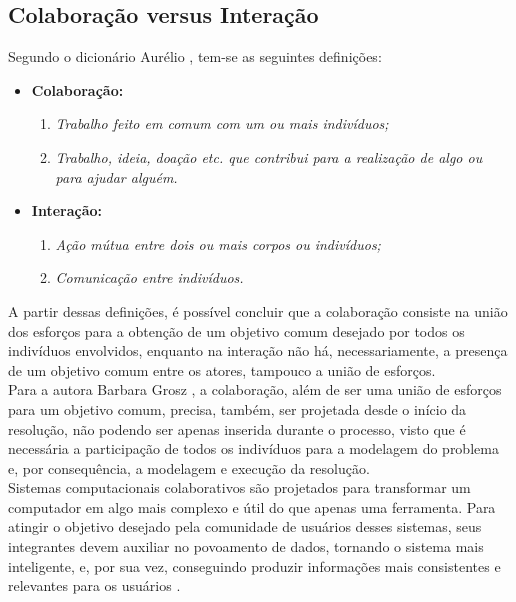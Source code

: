 \subsection{Colaboração versus Interação}
\null \quad Segundo o dicionário Aurélio \cite{aurelio}, tem-se as seguintes definições:%
\begin{itemize}
  \item \textbf{Colaboração:}
  \begin{enumerate}
    \item \textit{Trabalho feito em comum com um ou mais indivíduos;}
    \item \textit{Trabalho, ideia, doação etc. que contribui para a realização de algo ou para ajudar alguém.}
  \end{enumerate}

  \item \textbf{Interação:}
  \begin{enumerate}
    \item \textit{Ação mútua entre dois ou mais corpos ou indivíduos;}
    \item \textit{Comunicação entre indivíduos.}
  \end{enumerate}
\end{itemize}
 \null
\quad A partir dessas definições, é possível concluir que a colaboração consiste na união dos esforços
para a obtenção de um objetivo comum desejado por todos os indivíduos envolvidos, enquanto na interação
não há, necessariamente, a presença de um objetivo comum entre os atores, tampouco a união de esforços. \\ \null \quad
Para a autora Barbara Grosz \cite{cbarbara}, a colaboração, além de ser uma união de esforços para um objetivo comum,
precisa, também, ser projetada desde o início da resolução, não podendo ser apenas inserida durante o processo, visto que é
necessária a participação de todos os indivíduos para a modelagem do problema e, por consequência, a modelagem e execução da resolução.
\\
\null \quad Sistemas computacionais colaborativos são projetados para transformar um computador em algo mais complexo e útil do que apenas uma ferramenta.
Para atingir o objetivo desejado pela comunidade de usuários desses sistemas, seus integrantes devem auxiliar no povoamento de dados,
tornando o sistema mais inteligente, e, por sua vez, conseguindo produzir informações mais consistentes e relevantes para os usuários \cite{cbarbara}.


